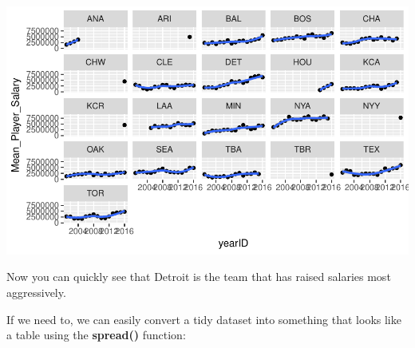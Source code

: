 \documentclass[]{book}
\newenvironment{Shaded}{\begin{snugshade}}{\end{snugshade}}
\newcommand{\DataTypeTok}[1]{\textcolor[rgb]{0.13,0.29,0.53}{#1}}
\newcommand{\DecValTok}[1]{\textcolor[rgb]{0.00,0.00,0.81}{#1}}
\newcommand{\KeywordTok}[1]{\textcolor[rgb]{0.13,0.29,0.53}{\textbf{#1}}}
\newcommand{\NormalTok}[1]{#1}
\newcommand{\OperatorTok}[1]{\textcolor[rgb]{0.81,0.36,0.00}{\textbf{#1}}}
\newcommand{\StringTok}[1]{\textcolor[rgb]{0.31,0.60,0.02}{#1}}
\theoremstyle{definition}
\theoremstyle{definition}
\theoremstyle{definition}
\theoremstyle{remark}
\begin{document}
\begin{Shaded}
\end{Shaded}

\begin{center}\includegraphics[width=0.7\linewidth]{DS4PS-I_files/figure-latex/unnamed-chunk-155-1} \end{center}

Now you can quickly see that Detroit is the team that has raised
salaries most aggressively.

If we need to, we can easily convert a tidy dataset into something that
looks like a table using the \textbf{spread()} function:
\end{document}
